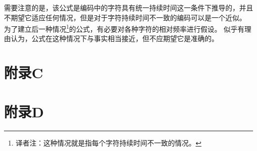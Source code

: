 \documentclass{hfutpaper}
\begin{document}
需要注意的是，该公式是编码中的字符具有统一持续时间这一条件下推导的，并且不期望它适应任何情况，但是对于字符持续时间不一致的编码可以是一个近似。 为了建立后一种情况\footnote{译者注：这种情况就是指每个字符持续时间不一致的情况。}的公式，有必要对各种字符的相对频率进行假设。
似乎有理由认为，公式在这种情况下与事实相当接近，但不应期望它是准确的。

\section{附录C}

\section{附录D}
\end{document}
